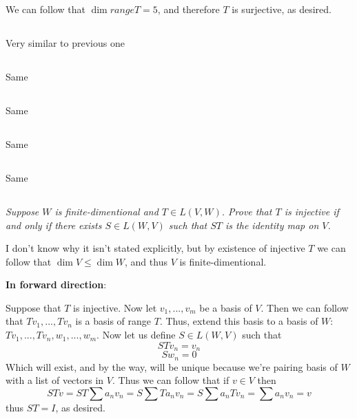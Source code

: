 \documentclass[11pt,oneside,titlepage]{book}
\begin{document}
We can follow that $\dim range T = 5$, and therefore $T$ is surjective, as desired.

\subsection{}

Very similar to previous one

\subsection{}

Same

\subsection{}

Same

\subsection{}

Same

\subsection{}

Same

\subsection{}

\textit{Suppose $W$ is finite-dimentional and $T \in L(V, W)$. Prove that $T$ is injective
  if and only if there exists $S \in L(W, V)$ such that $ST$ is the identity map on $V$.}

I don't know why it isn't stated explicitly, but by existence of injective $T$ we can
follow that $\dim V \leq \dim W$, and thus $V$ is finite-dimentional.

\textbf{In forward  direction}:

Suppose that $T$ is injective. Now let $v_1, ..., v_m$ be a basis of $V$. Then we can follow
that $Tv_1, ..., Tv_n$ is a basis of range $T$. Thus, extend this basis to a basis of $W$:
$Tv_1, ..., Tv_n, w_1, ..., w_m$. Now let us define $S \in L(W, V)$ such that
$$S Tv_n = v_n$$ 
$$S w_n = 0$$
Which will exist, and by the way, will be unique
because we're pairing basis of $W$ with a list of vectors in $V$. Thus we
can follow that if $v \in V$ then
$$ST v = ST \sum a_n v_n = S \sum T a_n v_n = S \sum a_n T  v_n = \sum a_n v_n = v$$
thus $ST = I$, as desired.
\end{document}
